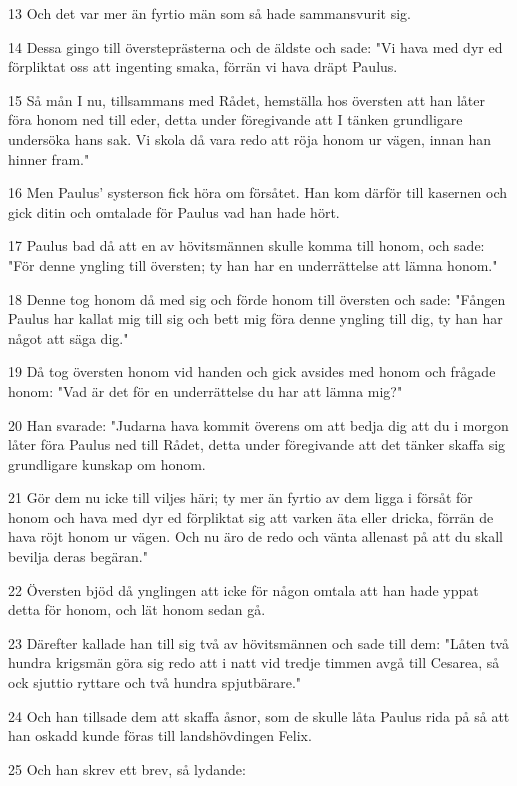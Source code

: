 \par 13 Och det var mer än fyrtio män som så hade sammansvurit sig.
\par 14 Dessa gingo till översteprästerna och de äldste och sade: "Vi hava med dyr ed förpliktat oss att ingenting smaka, förrän vi hava dräpt Paulus.
\par 15 Så mån I nu, tillsammans med Rådet, hemställa hos översten att han låter föra honom ned till eder, detta under föregivande att I tänken grundligare undersöka hans sak. Vi skola då vara redo att röja honom ur vägen, innan han hinner fram."
\par 16 Men Paulus' systerson fick höra om försåtet. Han kom därför till kasernen och gick ditin och omtalade för Paulus vad han hade hört.
\par 17 Paulus bad då att en av hövitsmännen skulle komma till honom, och sade: "För denne yngling till översten; ty han har en underrättelse att lämna honom."
\par 18 Denne tog honom då med sig och förde honom till översten och sade: "Fången Paulus har kallat mig till sig och bett mig föra denne yngling till dig, ty han har något att säga dig."
\par 19 Då tog översten honom vid handen och gick avsides med honom och frågade honom: "Vad är det för en underrättelse du har att lämna mig?"
\par 20 Han svarade: "Judarna hava kommit överens om att bedja dig att du i morgon låter föra Paulus ned till Rådet, detta under föregivande att det tänker skaffa sig grundligare kunskap om honom.
\par 21 Gör dem nu icke till viljes häri; ty mer än fyrtio av dem ligga i försåt för honom och hava med dyr ed förpliktat sig att varken äta eller dricka, förrän de hava röjt honom ur vägen. Och nu äro de redo och vänta allenast på att du skall bevilja deras begäran."
\par 22 Översten bjöd då ynglingen att icke för någon omtala att han hade yppat detta för honom, och lät honom sedan gå.
\par 23 Därefter kallade han till sig två av hövitsmännen och sade till dem: "Låten två hundra krigsmän göra sig redo att i natt vid tredje timmen avgå till Cesarea, så ock sjuttio ryttare och två hundra spjutbärare."
\par 24 Och han tillsade dem att skaffa åsnor, som de skulle låta Paulus rida på så att han oskadd kunde föras till landshövdingen Felix.
\par 25 Och han skrev ett brev, så lydande:
